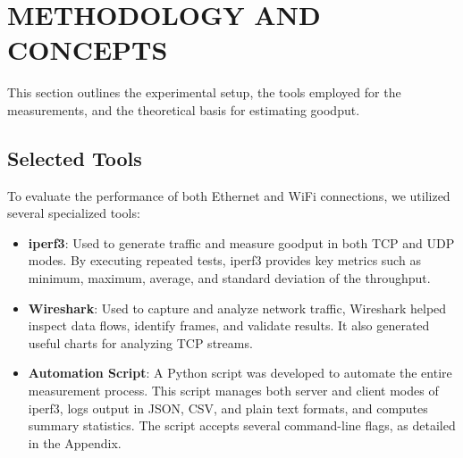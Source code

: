 
\section{METHODOLOGY AND CONCEPTS} \label{sec:methodology-and-concepts}


    This section outlines the experimental setup, the tools employed for the measurements, and the theoretical basis for estimating goodput.

    \subsection{Selected Tools} \label{subsec:selected-tools}

        To evaluate the performance of both Ethernet and WiFi connections, we utilized several specialized tools:

        \begin{itemize}
            \item \textbf{iperf3}: Used to generate traffic and measure goodput in both TCP and UDP modes. By executing repeated tests, iperf3 provides key metrics such as minimum, maximum, average, and standard deviation of the throughput.
            \item \textbf{Wireshark}: Used to capture and analyze network traffic, Wireshark helped inspect data flows, identify frames, and validate results. It also generated useful charts for analyzing TCP streams.
            \item \textbf{Automation Script}: A Python script was developed to automate the entire measurement process. This script manages both server and client modes of iperf3, logs output in JSON, CSV, and plain text formats, and computes summary statistics. 
                The script accepts several command-line flags, as detailed in the Appendix. %
        \end{itemize}

